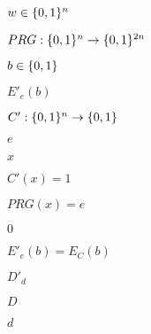 \documentclass[10pt]{book}
\begin{document}
\begin{mdSnippets}
\begin{mdInlineSnippet}[3d82b817f50058751828b133814c8acd]
$w \in \{0,1\}^n$\end{mdInlineSnippet}%
\begin{mdInlineSnippet}[e83d5cb30630240529e365af23fcf81c]%
$PRG: \{0,1\}^n \to \{0,1\}^{2n}$\end{mdInlineSnippet}%
\begin{mdInlineSnippet}[6892f7e7c3b8ecc19e4a077e82515567]%
$b \in \{0,1\}$\end{mdInlineSnippet}%
\begin{mdInlineSnippet}[2512eedabbd8d79db52145cd4fa18250]%
$E'_e(b)$\end{mdInlineSnippet}%
\begin{mdInlineSnippet}%
$C': \{0,1\}^n \to \{0,1\}$\end{mdInlineSnippet}%
\begin{mdInlineSnippet}[e1671797c52e15f763380b45e841ec32]%
$e$\end{mdInlineSnippet}%
\begin{mdInlineSnippet}[9dd4e461268c8034f5c8564e155c67a6]%
$x$\end{mdInlineSnippet}%
\begin{mdInlineSnippet}%
$C'(x) = 1$\end{mdInlineSnippet}%
\begin{mdInlineSnippet}[2dc186a255636d14ea6c553a4178b52a]%
$PRG(x) = e$\end{mdInlineSnippet}%
\begin{mdInlineSnippet}%
$0$\end{mdInlineSnippet}%
\begin{mdInlineSnippet}%
$E'_e(b) = E_C(b)$\end{mdInlineSnippet}%
\begin{mdInlineSnippet}[422dd4585043cd469cae496c9571f1ae]%
$D'_d$\end{mdInlineSnippet}%
\begin{mdInlineSnippet}[f623e75af30e62bbd73d6df5b50bb7b5]%
$D$\end{mdInlineSnippet}%
\begin{mdInlineSnippet}[8277e0910d750195b448797616e091ad]%
$d$\end{mdInlineSnippet}%

\end{mdSnippets}
\end{document}
